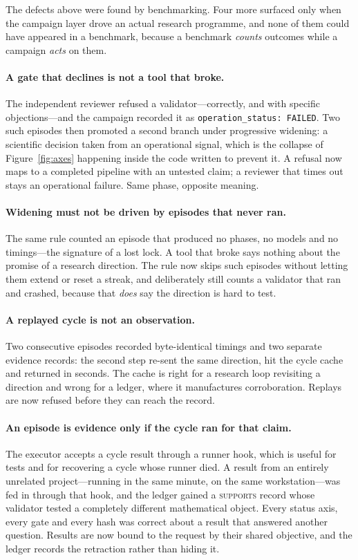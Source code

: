\documentclass[11pt,a4paper]{article}
\newcommand{\code}[1]{\texttt{\small #1}}
\begin{document}
The defects above were found by benchmarking. Four more surfaced only when the
campaign layer drove an actual research programme, and none of them could have
appeared in a benchmark, because a benchmark \emph{counts} outcomes while a
campaign \emph{acts} on them.

\paragraph{A gate that declines is not a tool that broke.} The independent
reviewer refused a validator---correctly, and with specific objections---and the
campaign recorded it as \code{operation\_status: FAILED}. Two such episodes then
promoted a second branch under progressive widening: a scientific decision taken
from an operational signal, which is the collapse of Figure~\ref{fig:axes}
happening inside the code written to prevent it. A refusal now maps to a
completed pipeline with an untested claim; a reviewer that times out stays an
operational failure. Same phase, opposite meaning.

\paragraph{Widening must not be driven by episodes that never ran.} The same
rule counted an episode that produced no phases, no models and no timings---the
signature of a lost lock. A tool that broke says nothing about the promise of a
research direction. The rule now skips such episodes without letting them extend
or reset a streak, and deliberately still counts a validator that ran and
crashed, because that \emph{does} say the direction is hard to test.

\paragraph{A replayed cycle is not an observation.} Two consecutive episodes
recorded byte-identical timings and two separate evidence records: the second
step re-sent the same direction, hit the cycle cache and returned in seconds. The
cache is right for a research loop revisiting a direction and wrong for a ledger,
where it manufactures corroboration. Replays are now refused before they can
reach the record.

\paragraph{An episode is evidence only if the cycle ran for that claim.}
\label{sec:foreign}
The executor accepts a cycle result through a runner hook, which is useful for
tests and for recovering a cycle whose runner died. A result from an entirely
unrelated project---running in the same minute, on the same workstation---was
fed in through that hook, and the ledger gained a \textsc{supports} record whose
validator tested a completely different mathematical object. Every status axis,
every gate and every hash was correct about a result that answered another
question. Results are now bound to the request by their shared objective, and
the ledger records the retraction rather than hiding it.
\end{document}
